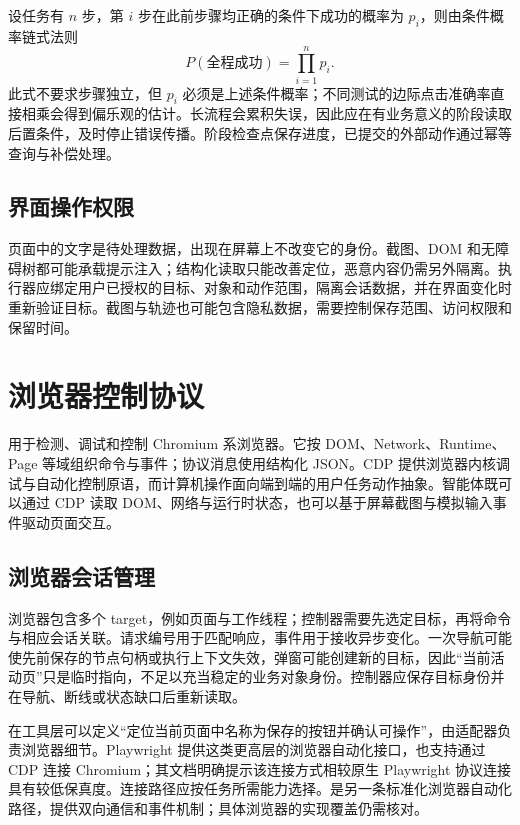 \documentclass[../textbook.tex]{subfiles}
\begin{document}
设任务有 $n$ 步，第 $i$ 步在此前步骤均正确的条件下成功的概率为 $p_i$，则由条件概率链式法则
\begin{equation}
 P(\text{全程成功})=\prod_{i=1}^{n}p_i.
\end{equation}
此式不要求步骤独立，但 $p_i$ 必须是上述条件概率；不同测试的边际点击准确率直接相乘会得到偏乐观的估计。长流程会累积失误，因此应在有业务意义的阶段读取后置条件，及时停止错误传播。阶段检查点保存进度，已提交的外部动作通过幂等查询与补偿处理。

\subsection{界面操作权限}
页面中的文字是待处理数据，出现在屏幕上不改变它的身份。截图、DOM 和无障碍树都可能承载提示注入；结构化读取只能改善定位，恶意内容仍需另外隔离。执行器应绑定用户已授权的目标、对象和动作范围，隔离会话数据，并在界面变化时重新验证目标。截图与轨迹也可能包含隐私数据，需要控制保存范围、访问权限和保留时间。

\section{浏览器控制协议}
\optional
\label{sec:browser-control}
用于检测、调试和控制 Chromium 系浏览器。它按 DOM、Network、Runtime、Page 等域组织命令与事件；协议消息使用结构化 JSON\cite{chromium2026cdp}。CDP 提供浏览器内核调试与自动化控制原语，而计算机操作面向端到端的用户任务动作抽象。智能体既可以通过 CDP 读取 DOM、网络与运行时状态，也可以基于屏幕截图与模拟输入事件驱动页面交互。

\subsection{浏览器会话管理}
浏览器包含多个 target，例如页面与工作线程；控制器需要先选定目标，再将命令与相应会话关联。请求编号用于匹配响应，事件用于接收异步变化。一次导航可能使先前保存的节点句柄或执行上下文失效，弹窗可能创建新的目标，因此“当前活动页”只是临时指向，不足以充当稳定的业务对象身份。控制器应保存目标身份并在导航、断线或状态缺口后重新读取。

在工具层可以定义“定位当前页面中名称为保存的按钮并确认可操作”，由适配器负责浏览器细节。Playwright 提供这类更高层的浏览器自动化接口，也支持通过 CDP 连接 Chromium；其文档明确提示该连接方式相较原生 Playwright 协议连接具有较低保真度。\cite{playwright2026browsertype}连接路径应按任务所需能力选择。是另一条标准化浏览器自动化路径，提供双向通信和事件机制；具体浏览器的实现覆盖仍需核对。\cite{w3c2026webdriverbidi}
\end{document}
